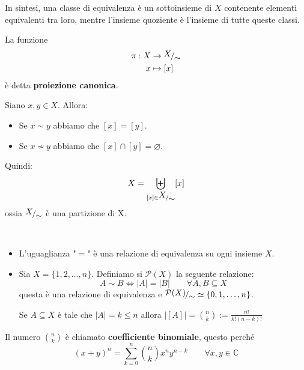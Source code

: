 \documentclass[../main.tex]{subfiles}
\begin{document}
In sintesi, una classe di equivalenza è un sottoinsieme di $X$ contenente elementi equivalenti tra loro, mentre l'insieme quoziente è l'insieme di tutte queste classi.

\begin{definition}
    La funzione
    \begin{align*}
        \pi : X & \to \nicefrac{X}{\sim} \\
        x       & \mapsto [x]
    \end{align*}
    è detta \textbf{proiezione canonica}.
\end{definition}

\begin{proposition}
    \label{prop:1.35}
    Siano $x,y \in X$. Allora:
    \begin{itemize}
        \item Se $x \sim y$ abbiamo che $[x] = [y]$.
        \item Se $x \nsim y$ abbiamo che $[x] \cap [y] = \varnothing$.
    \end{itemize}
    Quindi:
    \[
        X = \underset{[x] \in \nicefrac{X}{\sim}}{\biguplus} [x]
    \]
    ossia $\nicefrac{X}{\sim}$ è una partizione di X.
\end{proposition}

\begin{example}
    \
    \begin{itemize}
        \item L'uguaglianza "$=$" è una relazione di equivalenza
              su ogni insieme $X$.
        \item Sia $X = \{1,2,\ldots,n\}$. Definiamo si $\mathcal{P}(X)$ la seguente relazione:
              \[
                  A \sim B \iff |A| = |B| \qquad \forall A,B \subseteq X
              \]
              questa è una relazione di equivalenza e $\nicefrac{\mathcal{P}(X)}{\sim}
                  \simeq \{0,1,\ldots,n\}$.

              Se $A \subseteq X$ è tale che $|A| = k \leq n$ allora $|[A]| = \binom{n}{k} := \frac{n!}{k!(n-k)!}$
    \end{itemize}
\end{example}

\begin{definition}
    Il numero $\binom{n}{k}$ è chiamato \textbf{coefficiente binomiale}, questo perché
    \[
        (x+y)^n = \sum_{k=0}^{n} \binom{n}{k} x^n y^{n-k} \qquad \forall x,y \in \mathbb{C}
    \]
\end{definition}
\end{document}
